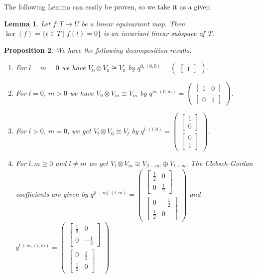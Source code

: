 \documentclass[12pt, a4paper]{article}
\theoremstyle{plain}
\newtheorem{pro}{Proposition}[section]
\newtheorem{lem}[pro]{Lemma}
\theoremstyle{definition}
\theoremstyle{remark}
\begin{document}
The following Lemma can easily be proven, so we take it as a given:

\begin{lem}\label{kernel invariant subspace}
Let $f: T \to U$ be a linear equivariant map. Then $\ker(f) = \{t \in T \mid f(t) = 0\}$ is an invariant linear subspace of T.
\end{lem}

\begin{pro}\label{decomposition_results}
We have the following decomposition results:
\begin{enumerate}
\item For $l = m = 0$ we have $V_0 \otimes V_0 \cong V_0$ by $q^{0,(0,0)} = \begin{pmatrix} \begin{bmatrix} 1 \end{bmatrix}\end{pmatrix}$.
\item For $l=0$, $m > 0$ we have $V_0 \otimes V_m \cong V_m$ by $q^{m,(0,m)} = \begin{pmatrix}\begin{bmatrix} 1 & 0\end{bmatrix} \\ \begin{bmatrix} 0 & 1\end{bmatrix}\end{pmatrix}$. \item For $l > 0$, $m = 0$, we get $V_l \otimes V_0 \cong V_l$ by $q^{l,(l,0)} = \begin{pmatrix} \begin{bmatrix}1 \\ 0 \end{bmatrix} \\ \begin{bmatrix} 0 \\ 1\end{bmatrix}\end{pmatrix}$.
\item For $l, m \geq 0$ and $l \neq m$ we get $V_l \otimes V_m \cong V_{|l-m|} \oplus V_{l+m}$. The Clebsch-Gordan coefficients are given by $q^{|l-m|,(l,m)} =\begin{pmatrix}\begin{bmatrix} \frac{1}{2} & 0 \\ 0 & \frac{1}{2}\end{bmatrix} \\ \begin{bmatrix} 0 & -\frac{1}{2} \\ \frac{1}{2} & 0\end{bmatrix} \end{pmatrix}$ and $q^{l+m,(l,m)} = \begin{pmatrix}\begin{bmatrix} \frac{1}{2} & 0 \\ 0 & -\frac{1}{2}\end{bmatrix} \\ \begin{bmatrix} 0 & \frac{1}{2} \\ \frac{1}{2} & 0\end{bmatrix} \end{pmatrix}$

\end{enumerate}
\end{pro}
\end{document}
